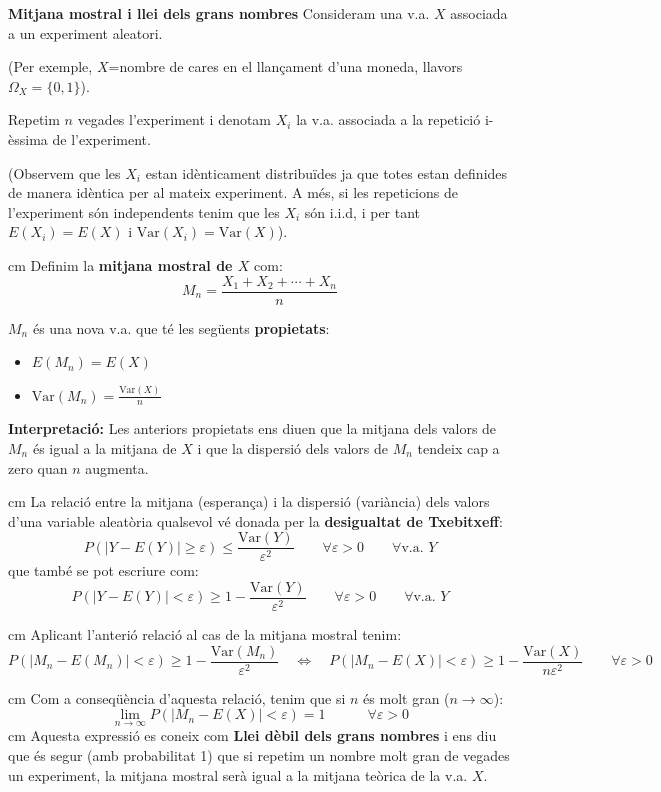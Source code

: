\documentclass{article}
\begin{document}
\noindent
\textbf{\large Mitjana mostral i llei dels grans nombres}
\vskip 0.2cm
Consideram una v.a. $X$ associada a un experiment aleatori.

(Per exemple, $X$=nombre de cares en el llan\c{c}ament d'una moneda,
llavors $\Omega_X=\{0, 1\}$).

\vskip 0.2cm
Repetim $n$ vegades l'experiment i denotam $X_i$ la v.a. associada a la
repetici\'o i-\`essima de l'experiment.

(Observem que les $X_i$ estan id\`enticament distribu\"ides ja que totes
estan definides de manera id\`entica per al mateix experiment. A m\'es,
si les repeticions de l'experiment s\'on independents tenim que les $X_i$
s\'on i.i.d, i per tant $E(X_i)=E(X)$ i $\mathrm{Var}(X_i)=\mathrm{Var}(X)$).

 cm
Definim la \textbf{mitjana mostral de $X$} com:
\[
M_n=\frac{X_1+X_2+\cdots+X_n}{n}
\]

$M_n$ \'es una nova v.a. que t\'e les seg\"uents \textbf{propietats}:
\begin{itemize}
\item $E(M_n)=E(X)$
\item $\mathrm{Var}(M_n)=\displaystyle \frac{\mathrm{Var}(X)}{n}$
\end{itemize}

\textbf{Interpretaci\'o:}
Les anteriors propietats ens diuen que la mitjana dels valors de $M_n$ \'es igual a
la mitjana de $X$ i que la dispersi\'o dels valors de $M_n$ tendeix cap a zero
quan $n$ augmenta.


 cm
La relaci\'o entre la mitjana (esperan\c{c}a) i la dispersi\'o (vari\`ancia) dels valors 
d'una variable aleat\`oria qualsevol v\'e donada per la \textbf{desigualtat de Txebitxeff}:
\[
P(|Y-E(Y)| \geq \varepsilon) \leq \frac{\mathrm{Var}(Y)}{\varepsilon^2} \qquad 
\forall \varepsilon > 0 \qquad
\forall \text{v.a. } Y
\]
\noindent
que tamb\'e se pot escriure com:
\[
P(|Y-E(Y)| < \varepsilon) \geq 1- \frac{\mathrm{Var}(Y)}{\varepsilon^2} \qquad 
\forall \varepsilon > 0 \qquad
\forall \text{v.a. } Y
\]


 cm
Aplicant l'anteri\'o relaci\'o al cas de la mitjana mostral tenim:
\[
P(|M_n-E(M_n)| < \varepsilon) \geq 1- \frac{\mathrm{Var}(M_n)}{\varepsilon^2} \quad
\Longleftrightarrow \quad 
P(|M_n-E(X)| < \varepsilon) \geq 1- \frac{\mathrm{Var}(X)}{n \varepsilon^2}
\qquad \forall \varepsilon > 0 
\]

 cm
Com a conseq\"u\`encia d'aquesta relaci\'o, tenim que si $n$ \'es molt gran ($n \rightarrow \infty$):
\[
\lim_{n\rightarrow \infty} P(|M_n-E(X)| < \varepsilon) = 1 \qquad \quad \forall \varepsilon > 0 
\]
 cm
Aquesta expressi\'o es coneix com \textbf{Llei d\`ebil dels grans nombres} i ens diu que
\'es segur (amb probabilitat 1) que si repetim un nombre molt gran de vegades un experiment,
la mitjana mostral ser\`a igual a la mitjana te\`orica de la v.a. $X$.
\end{document}

